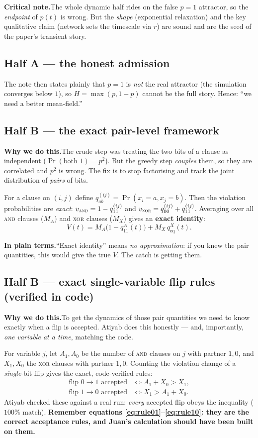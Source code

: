 \documentclass[11pt]{article}
\newcommand{\plain}[1]{%
  \par\smallskip\noindent
  \colorbox{yellow!18}{\parbox{\dimexpr\linewidth-2\fboxsep}{%
  \textbf{In plain terms.}\quad #1}}\par\smallskip}
\newcommand{\why}[1]{%
  \par\smallskip\noindent
  \colorbox{blue!8}{\parbox{\dimexpr\linewidth-2\fboxsep}{%
  \textbf{Why we do this.}\quad #1}}\par\smallskip}
\newcommand{\crit}[1]{%
  \par\smallskip\noindent
  \colorbox{red!8}{\parbox{\dimexpr\linewidth-2\fboxsep}{%
  \textbf{Critical note.}\quad #1}}\par\smallskip}
\begin{document}
\crit{The whole dynamic half rides on the false $p=1$ attractor, so the \emph{endpoint} of
$p(t)$ is wrong. But the \emph{shape} (exponential relaxation) and the key qualitative claim
(network sets the timescale via $r$) are sound and are the seed of the paper's transient story.}

\subsection{Half A --- the honest admission}
The note then states plainly that $p=1$ is \emph{not} the real attractor (the simulation converges
below $1$), so $H=\max(p,1-p)$ cannot be the full story. Hence: ``we need a better mean-field.''

\subsection{Half B --- the exact pair-level framework}
\why{The crude step was treating the two bits of a clause as independent ($\Pr(\text{both }1)=p^2$).
But the greedy step \emph{couples} them, so they are correlated and $p^2$ is wrong. The fix is to
stop factorising and track the joint distribution of \emph{pairs} of bits.}

For a clause on $(i,j)$ define $q^{(ij)}_{ab}=\Pr(x_i=a,x_j=b)$. Then the violation probabilities
are \emph{exact}: $v_{\textsc{and}}=1-q^{(ij)}_{11}$ and $v_{\textsc{xor}}=q^{(ij)}_{00}+q^{(ij)}_{11}$.
Averaging over all \textsc{and} clauses ($M_A$) and \textsc{xor} clauses ($M_X$) gives an
\textbf{exact identity}:
\begin{equation}
V(t)=M_A\bigl(1-q^{A}_{11}(t)\bigr)+M_X\,q^{X}_{\text{eq}}(t).
\label{eq:V_exact}
\end{equation}
\plain{``Exact identity'' means \emph{no approximation}: if you knew the pair quantities, this
would give the true $V$. The catch is getting them.}

\subsection{Half B --- exact single-variable flip rules (verified in code)}
\why{To get the dynamics of those pair quantities we need to know exactly when a flip is accepted.
Atiyab does this honestly --- and, importantly, \emph{one variable at a time}, matching the code.}

For variable $j$, let $A_1,A_0$ be the number of \textsc{and} clauses on $j$ with partner $1,0$,
and $X_1,X_0$ the \textsc{xor} clauses with partner $1,0$. Counting the violation change of a
\emph{single}-bit flip gives the exact, code-verified rules:
\begin{align}
\text{flip }0\to1\text{ accepted} &\iff A_1+X_0>X_1, \label{eq:rule01}\\
\text{flip }1\to0\text{ accepted} &\iff X_1>A_1+X_0. \label{eq:rule10}
\end{align}
Atiyab checked these against a real run: \emph{every} accepted flip obeys the inequality
($100\%$ match). \textbf{Remember equations \eqref{eq:rule01}--\eqref{eq:rule10}: they are the
correct acceptance rules, and Juan's calculation should have been built on them.}
\end{document}
